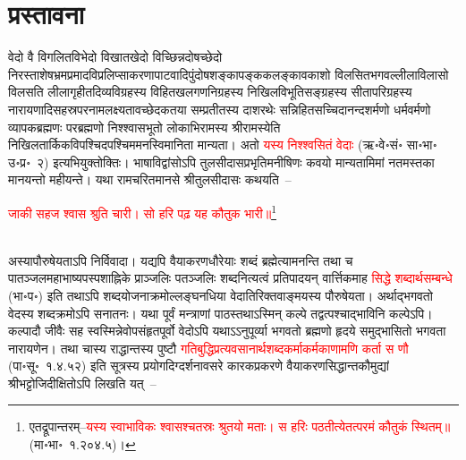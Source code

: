 %
%
%

\renewcommand\chaptername{अथ प्रस्तावना}
\chapter[प्रस्तावना]{प्रस्तावना}
\fontsize{14}{21}\selectfont
\begin{sloppypar}\justifying\noindent\hspace{10mm} वेदो वै विगलित\-विभेदो विखात\-खेदो विच्छिन्न\-दोषच्छेदो निरस्ताशेष\-भ्रम\-प्रमाद\-विप्रलिप्सा\-करणापाटवादि\-पुंदोष\-शङ्का\-पङ्क\-कलङ्कावकाशो विलसित\-भगवल्लीला\-विलासो विलसति लीला\-गृहीत\-दिव्य\-विग्रहस्य विहित\-खल\-गण\-निग्रहस्य निखिल\-विभूति\-सङ्ग्रहस्य सीता\-परिग्रहस्य नारायणादि\-सहस्र\-पर\-नाम\-लक्ष्यतावच्छेदकतया सम्प्रतीतस्य दाशरथेः सन्निहित\-सच्चिदानन्द\-शर्मणो धर्म\-वर्मणो व्यापक\-ब्रह्मणः पर\-ब्रह्मणो निश्श्वास\-भूतो लोकाभिरामस्य श्रीरामस्येति निखिल\-तार्किक\-विपश्चिदपश्चिम\-मनस्वि\-मानिता मान्यता। अतो \textcolor{red}{यस्य निश्श्वसितं वेदाः} (ऋ॰वे॰सं॰ सा॰भा॰ उ॰प्र॰~२) इत्यभियुक्तोक्तिः। भाषा\-विद्वांसोऽपि तुलसीदास\-प्रभृति\-मनीषिणः कवयो मान्यतामिमां नतमस्तका मानयन्तो महीयन्ते। यथा रामचरितमानसे श्रीतुलसीदासः कथयति~–\end{sloppypar}
\centering\textcolor{red}{जाकी सहज श्वास श्रुति चारी। सो हरि पढ़ यह कौतुक भारी॥}\footnote{एतद्रूपान्तरम्–\textcolor{red}{यस्य स्वाभाविकः श्वासश्चतस्रः श्रुतयो मताः। स हरिः पठतीत्येतत्परमं कौतुकं स्थितम्॥} (मा॰भा॰~१.२०४.५)।}\nopagebreak\\
\\
\begin{sloppypar}\justifying\noindent\hspace{10mm} अस्यापौरुषेयताऽपि निर्विवादा। यद्यपि वैयाकरण\-धौरेयाः शब्दं ब्रह्मेत्यामनन्ति तथा च पातञ्जल\-महाभाष्य\-पस्पशाह्निके प्राञ्जलिः पतञ्जलिः शब्द\-नित्यत्वं प्रतिपादयन् वार्त्तिकमाह \textcolor{red}{सिद्धे शब्दार्थ\-सम्बन्धे} (भा॰प॰) इति तथाऽपि शब्द\-योजना\-क्रमोल्लङ्घन\-धिया वेदातिरिक्त\-वाङ्मयस्य पौरुषेयता। अर्थाद्भगवतो वेदस्य शब्द\-क्रमोऽपि सनातनः। यथा पूर्वं मन्त्राणां पाठस्तथाऽस्मिन् कल्पे तद्वत्पश्चाद्भाविनि कल्पेऽपि। कल्पादौ जीवैः सह स्वस्मिन्नेवोपसंहृत\-पूर्वो वेदोऽपि यथाऽऽनुपूर्व्या भगवतो ब्रह्मणो हृदये समुद्भासितो भगवता नारायणेन। तथा चास्य राद्धान्तस्य पुष्टौ \textcolor{red}{गति\-बुद्धि\-प्रत्यवसानार्थ\-शब्द\-कर्माकर्मकाणामणि कर्ता स णौ} (पा॰सू॰~१.४.५२) इति सूत्रस्य प्रयोग\-दिग्दर्शनावसरे कारक\-प्रकरणे वैयाकरण\-सिद्धान्त\-कौमुद्यां श्रीभट्टोजि\-दीक्षितोऽपि लिखति यत्~–\end{sloppypar}
